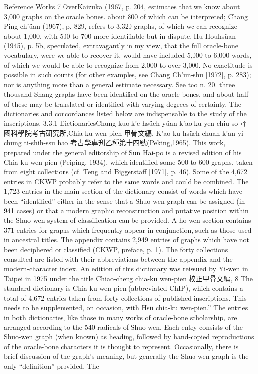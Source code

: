 Reference Works
7
OverKaizuka (1967, p. 204, estimates that we know about 3,000 graphs on the oracle bones. about 800 of which can be interpreted; Chang Ping-ch'üan (1967), p. 829, refers to 3,320 graphs, of which we can recognize about 1,000, with 500 to 700 more identifiable but in dispute. Hu Houhsüan (1945), p. 5b, speculated, extravagantly in my view, that the full oracle-bone vocabulary, were we able to recover it, would have included 5,000 to 6,000 words, of which we would be able to recognize from 2,000 to over 3,000. No exactitude is possible in such counts (for other examples, see Chang Ch'un-shu [1972], p. 283); nor is anything more than a general estimate necessary. See too n. 20. three thousand Shang graphs have been identified on the oracle bones, and
about half of these may be translated or identified with varying degrees of certainty. The
dictionaries and concordances listed below are indispensable to the study of the inscriptions.
3.3.1
DictionariesChung-kuo k'e-hsüeh-yüan k'ao-ku yen-chiu-so ‹† 國科學院考古研究所,Chia-ku wen-pien 甲骨文編, K'ao-ku-hsüeh chuan-k'an yi-chung ti-shih-ssu hao 考古學專刋乙種第十四號(Peking,1965). This work, prepared under the general editorship of Sun Hai-po is a revised edition of his Chia-ku wen-pien (Peiping, 1934), which identified some 500 to 600 graphs, taken from eight collections (cf. Teng and Biggerstaff [1971], p. 46). Some of the 4,672 entries in CKWP probably refer to the same words and could be combined. The 1,723 entries in the main section of the dictionary consist of words which have been ``identified'' either in the sense that a Shuo-wen graph can be assigned (in 941 cases) or that a modern graphic reconstruction and putative position within the Shuo-wen system of classification can be provided. A ho-wen section contains 371 entries for graphs which frequently appear in conjunction, such as those used in ancestral titles. The appendix contains 2,949 entries of graphs which have not been deciphered or classified (CKWP, preface, p. 1). The forty collections consulted are listed with their abbreviations between the appendix and the modern-character index. An edition of this dictionary was reissued by Yi-wen in Taipei in 1975 under the title Chiao-cheng chia-ku wen-pien 校正甲骨文編,
8
The standard dictionary is Chia-ku wen-pien (abbreviated ChIP), which contains
a total of 4,672 entries taken from forty collections of published inscriptions. This needs
to be supplemented, on occasion, with Hsü chia-ku wen-pien.''
The entries in both dictionaries, like those in many works of oracle-bone scholarship,
are arranged according to the 540 radicals of Shuo-wen. Each entry consists of the Shuo-wen
graph (when known) as heading, followed by hand-copied reproductions of the oracle-bone characters it is thought to represent. Occasionally, there is brief discussion of the
graph's meaning, but generally the Shuo-wen graph is the only “definition” provided. The


